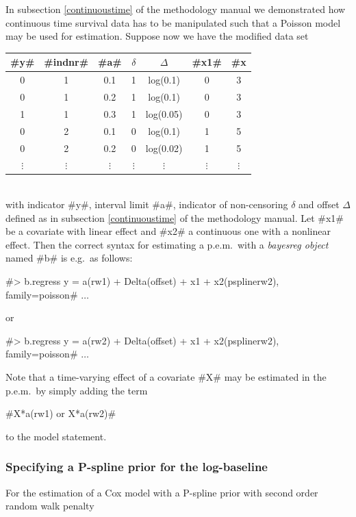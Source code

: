 In subsection \ref*{continuoustime} of the methodology manual we
demonstrated how continuous time survival data has to be manipulated
such that a Poisson model may be used for estimation. Suppose now we
have the modified data set
\vspace{0.5cm}\\
\begin{tabular}{c|c|c|c|c|c|c}
#y# & #indnr# & #a# & $\delta$ &  $\Delta$ &   #x1# &
#x#2\\\hline\hline
0 &  1 &   0.1 &   1  &  log(0.1) & 0  & 3\\
0  & 1   & 0.2  &  1  &  log(0.1) & 0 &  3\\
1  & 1   & 0.3  &  1  &  log(0.05)& 0  & 3\\\hline
0 &  2 &   0.1 &   0 &   log(0.1) & 1 &  5\\
0  & 2  &  0.2 &   0  &  log(0.02)& 1 &  5\\\hline
$\vdots$ & $\vdots$ & $\vdots$ & $\vdots$ & $\vdots$ & $\vdots$& $\vdots$\\
\end{tabular}
\vspace{0.5cm}\\
with indicator #y#, interval limit #a#, indicator of non-censoring
$\delta$ and offset $\Delta$ defined as in subsection
\ref*{continuoustime} of the methodology manual. Let #x1# be a
covariate with linear effect and #x2# a continuous one with a
nonlinear effect. Then the correct syntax for estimating a
p.e.m.~with a {\em bayesreg object} named #b# is e.g.~as follows:

 #> b.regress y = a(rw1) + Delta(offset) + x1 + x2(psplinerw2), family=poisson# $\ldots$

or

 #> b.regress y = a(rw2) + Delta(offset) + x1 + x2(psplinerw2), family=poisson# $\ldots$


Note that a time-varying effect of a covariate #X# may be
estimated in the p.e.m.~by simply adding the term

#X*a(rw1) or X*a(rw2)#

to the model statement.

\subsubsection*{Specifying a P-spline prior for the log-baseline}

For the estimation of a Cox model with a P-spline prior with
second order random walk penalty


